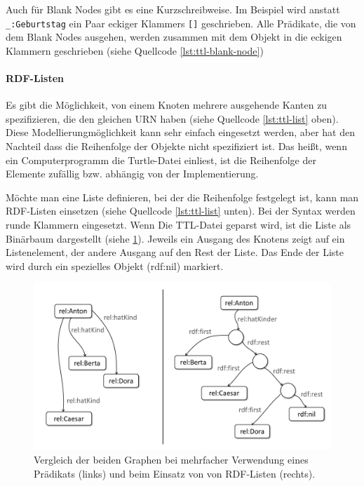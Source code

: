 Auch für Blank Nodes gibt es eine Kurzschreibweise. Im Beispiel wird anstatt \lstinline|_:Geburtstag| ein Paar eckiger Klammers \lstinline|[]| geschrieben. Alle Prädikate, die von dem Blank Nodes ausgehen, werden zusammen mit dem Objekt in die eckigen Klammern geschrieben (siehe Quellcode \ref{lst:ttl-blank-node})

\paragraph{RDF-Listen}
Es gibt die Möglichkeit, von einem Knoten mehrere ausgehende Kanten zu spezifizieren, die den gleichen URN haben (siehe Quellcode \ref{lst:ttl-list} oben). Diese Modellierungmöglichkeit kann sehr einfach eingesetzt werden, aber hat den Nachteil dass die Reihenfolge der Objekte nicht spezifiziert ist. Das heißt, wenn ein Computerprogramm  die Turtle-Datei einliest, ist die Reihenfolge der Elemente zufällig bzw. abhängig von der Implementierung.

Möchte man eine Liste definieren, bei der die Reihenfolge festgelegt ist, kann man RDF-Listen einsetzen (siehe Quellcode \ref{lst:ttl-list} unten). Bei der Syntax werden runde Klammern eingesetzt. Wenn Die TTL-Datei geparst wird, ist die Liste als Binärbaum dargestellt (siehe \ref{fig:rdflist}). Jeweils ein Ausgang des Knotens zeigt auf ein Listenelement, der andere Ausgang auf den Rest der Liste. Das Ende der Liste wird durch ein spezielles Objekt (rdf:nil) markiert.

\begin{figure}
	\centering
	\includegraphics[width=0.7\linewidth]{resources/figures/rdfList}
	\caption[Vergleich von Merhfachverwendung eines Prädikats und RDF-Listen]{Vergleich der beiden Graphen bei mehrfacher Verwendung eines Prädikats (links) und beim Einsatz von von RDF-Listen (rechts).}
	\label{fig:rdflist}
\end{figure}

